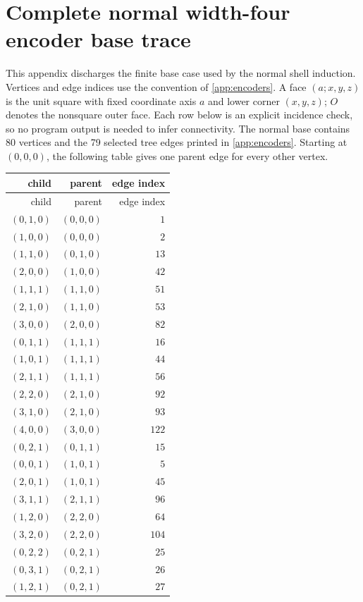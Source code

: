 \section{Complete normal width-four encoder base trace}
\label{app:width4-normal-trace}
This appendix discharges the finite base case used by the normal shell induction.  Vertices and edge indices use the convention of \cref{app:encoders}.  A face $(a;x,y,z)$ is the unit square with fixed coordinate axis $a$ and lower corner $(x,y,z)$; $O$ denotes the nonsquare outer face.  Each row below is an explicit incidence check, so no program output is needed to infer connectivity.
The normal base contains 80 vertices and the 79 selected tree edges printed in \cref{app:encoders}.  Starting at $(0,0,0)$, the following table gives one parent edge for every other vertex.
\begin{longtable}{@{}rrr@{}}
\toprule child & parent & edge index\\ \midrule
\endfirsthead \toprule child & parent & edge index\\ \midrule \endhead
$(0,1,0)$ & $(0,0,0)$ & $1$\\
$(1,0,0)$ & $(0,0,0)$ & $2$\\
$(1,1,0)$ & $(0,1,0)$ & $13$\\
$(2,0,0)$ & $(1,0,0)$ & $42$\\
$(1,1,1)$ & $(1,1,0)$ & $51$\\
$(2,1,0)$ & $(1,1,0)$ & $53$\\
$(3,0,0)$ & $(2,0,0)$ & $82$\\
$(0,1,1)$ & $(1,1,1)$ & $16$\\
$(1,0,1)$ & $(1,1,1)$ & $44$\\
$(2,1,1)$ & $(1,1,1)$ & $56$\\
$(2,2,0)$ & $(2,1,0)$ & $92$\\
$(3,1,0)$ & $(2,1,0)$ & $93$\\
$(4,0,0)$ & $(3,0,0)$ & $122$\\
$(0,2,1)$ & $(0,1,1)$ & $15$\\
$(0,0,1)$ & $(1,0,1)$ & $5$\\
$(2,0,1)$ & $(1,0,1)$ & $45$\\
$(3,1,1)$ & $(2,1,1)$ & $96$\\
$(1,2,0)$ & $(2,2,0)$ & $64$\\
$(3,2,0)$ & $(2,2,0)$ & $104$\\
$(0,2,2)$ & $(0,2,1)$ & $25$\\
$(0,3,1)$ & $(0,2,1)$ & $26$\\
$(1,2,1)$ & $(0,2,1)$ & $27$\\

\end{longtable}

